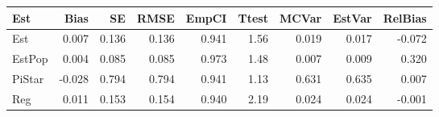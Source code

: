 
\begin{tabular}{lrrrrrrrr}
\toprule
Est & Bias & SE & RMSE & EmpCI & Ttest & MCVar & EstVar & RelBias\\
\midrule
Est & 0.007 & 0.136 & 0.136 & 0.941 & 1.56 & 0.019 & 0.017 & -0.072\\
EstPop & 0.004 & 0.085 & 0.085 & 0.973 & 1.48 & 0.007 & 0.009 & 0.320\\
PiStar & -0.028 & 0.794 & 0.794 & 0.941 & 1.13 & 0.631 & 0.635 & 0.007\\
Reg & 0.011 & 0.153 & 0.154 & 0.940 & 2.19 & 0.024 & 0.024 & -0.001\\
\bottomrule
\end{tabular}